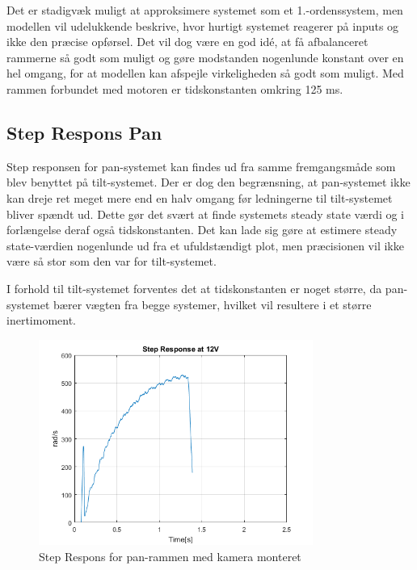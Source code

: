Det er stadigvæk muligt at approksimere systemet som et 1.-ordenssystem, men modellen vil udelukkende beskrive, hvor hurtigt systemet reagerer på inputs og ikke den præcise opførsel. Det vil dog være en god idé, at få afbalanceret rammerne så godt som muligt og gøre modstanden nogenlunde konstant over en hel omgang, for at modellen kan afspejle virkeligheden så godt som muligt. Med rammen forbundet med motoren er tidskonstanten omkring 125 ms.

\subsection{Step Respons Pan}\label{sec:Pan_Response}

Step responsen for pan-systemet kan findes ud fra samme fremgangsmåde som blev benyttet på tilt-systemet. Der er dog den begrænsning, at pan-systemet ikke kan dreje ret meget mere end en halv omgang før ledningerne til tilt-systemet bliver spændt ud. Dette gør det svært at finde systemets steady state værdi og i forlængelse deraf også tidskonstanten. Det kan lade sig gøre at estimere steady state-værdien nogenlunde ud fra et ufuldstændigt plot, men præcisionen vil ikke være så stor som den var for tilt-systemet. 

I forhold til tilt-systemet forventes det at tidskonstanten er noget større, da pan-systemet bærer vægten fra begge systemer, hvilket vil resultere i et større inertimoment. 

\begin{figure}[!ht]
	\begin{center}
		\includegraphics[width=0.8\textwidth]{Billeder/Pan_Response.png}
	\end{center}
	\caption{Step Respons for pan-rammen med kamera monteret}
	\label{fig:Pan_Response}
\end{figure}

